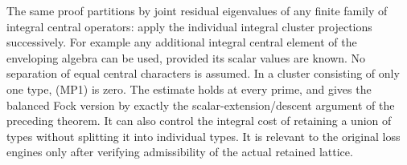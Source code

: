 The same proof partitions by joint residual eigenvalues of
any finite family of integral central operators: apply the
individual integral cluster projections successively.
For example any additional integral central element of the
enveloping algebra can be used, provided its scalar values are
known. No separation of equal central characters is assumed.
In a cluster consisting of only one type, (MP1) is zero.
The estimate holds at every prime, and gives the balanced Fock
version by exactly the scalar-extension/descent argument of the
preceding theorem. It can also control the integral cost of
retaining a union of types without splitting it into individual
types. It is relevant to the original loss engines only after
verifying admissibility of the actual retained lattice.

